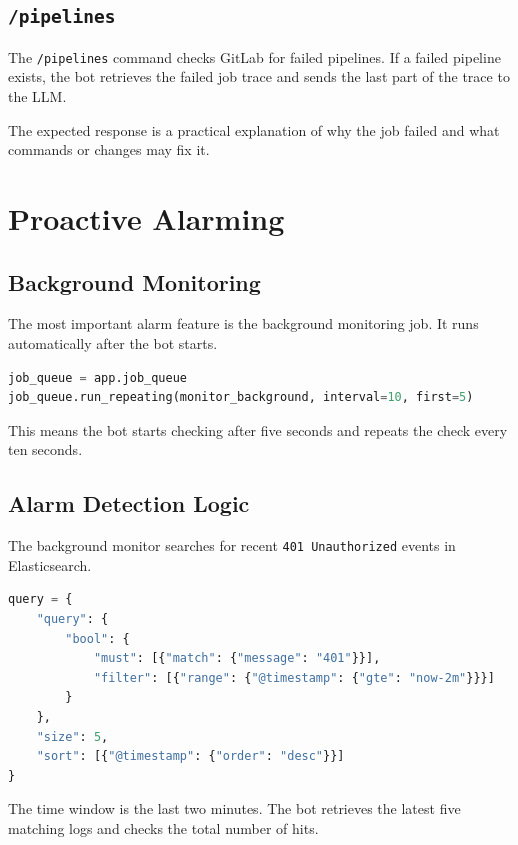 \documentclass[12pt,a4paper]{report}
\begin{document}
\section{\texttt{/pipelines}}

The \texttt{/pipelines} command checks GitLab for failed pipelines. If a failed pipeline exists, the bot retrieves the failed job trace and sends the last part of the trace to the LLM.

The expected response is a practical explanation of why the job failed and what commands or changes may fix it.

\chapter{Proactive Alarming}

\section{Background Monitoring}

The most important alarm feature is the background monitoring job. It runs automatically after the bot starts.

\begin{lstlisting}[language=Python,caption={Background monitor schedule}]
job_queue = app.job_queue
job_queue.run_repeating(monitor_background, interval=10, first=5)
\end{lstlisting}

This means the bot starts checking after five seconds and repeats the check every ten seconds.

\section{Alarm Detection Logic}

The background monitor searches for recent \texttt{401 Unauthorized} events in Elasticsearch.

\begin{lstlisting}[language=Python,caption={Alarm detection query}]
query = {
    "query": {
        "bool": {
            "must": [{"match": {"message": "401"}}],
            "filter": [{"range": {"@timestamp": {"gte": "now-2m"}}}]
        }
    },
    "size": 5,
    "sort": [{"@timestamp": {"order": "desc"}}]
}
\end{lstlisting}

The time window is the last two minutes. The bot retrieves the latest five matching logs and checks the total number of hits.
\end{document}
